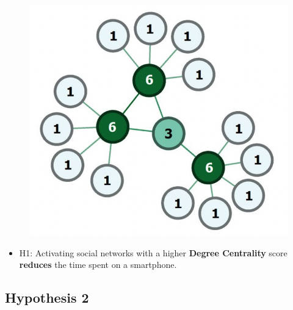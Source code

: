 \documentclass[
  letterpaper,
  DIV=11,
  numbers=noendperiod]{scrartcl}
\providecommand{\tightlist}{%
  \setlength{\itemsep}{0pt}\setlength{\parskip}{0pt}}\usepackage{longtable,booktabs,array}
\begin{document}
\begin{figure}

{\centering \includegraphics{images/centrality-01.png}

}

\end{figure}

\begin{itemize}
\tightlist
\item
  H1: Activating social networks with a higher \textbf{Degree
  Centrality} score \textbf{reduces} the time spent on a smartphone.
\end{itemize}

\hypertarget{hypothesis-2}{%
\subsection{Hypothesis 2}\label{hypothesis-2}}
\end{document}
